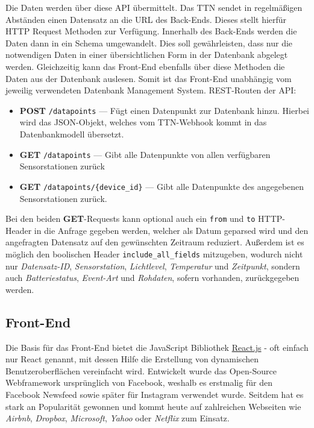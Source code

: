 \documentclass{article}
\begin{document}
Die Daten werden über diese API übermittelt. Das TTN sendet in regelmäßigen Abständen einen Datensatz an die URL des Back-Ends. 
Dieses stellt hierfür HTTP Request Methoden zur Verfügung. Innerhalb des Back-Ends werden die Daten dann in ein Schema umgewandelt.
Dies soll gewährleisten, dass nur die notwendigen Daten in einer übersichtlichen Form in der Datenbank abgelegt werden.
Gleichzeitig kann das Front-End ebenfalls über diese Methoden die Daten aus der Datenbank auslesen. Somit ist das Front-End unabhängig vom jeweilig verwendeten Datenbank Management System.
REST-Routen der API:
\begin{itemize}
    \item \textbf{POST} \texttt{/datapoints} --- Fügt einen Datenpunkt zur Datenbank hinzu. Hierbei wird das JSON-Objekt, welches vom TTN-Webhook kommt in das Datenbankmodell übersetzt.
    \item \textbf{GET} \texttt{/datapoints} --- Gibt alle Datenpunkte von allen verfügbaren Sensorstationen zurück
    \item \textbf{GET} \texttt{/datapoints/\{device\_id\}}  --- Gibt alle Datenpunkte des angegebenen Sensorstationen zurück.
\end{itemize}
Bei den beiden \textbf{GET}-Requests kann optional auch ein \texttt{from} und \texttt{to} HTTP-Header in die Anfrage gegeben werden, welcher als Datum geparsed wird und den angefragten Datensatz auf den gewünschten Zeitraum reduziert.
Außerdem ist es möglich den boolischen Header \texttt{include\_all\_fields} mitzugeben, wodurch nicht nur \textit{Datensatz-ID}, \textit{Sensorstation}, \textit{Lichtlevel}, \textit{Temperatur} und \textit{Zeitpunkt}, sondern auch \textit{Batteriestatus}, \textit{Event-Art} und \textit{Rohdaten}, sofern vorhanden, zurückgegeben werden.

\subsection{Front-End}
Die Basis für das Front-End bietet die JavaScript Bibliothek \href{https://reactjs.org}{React.js} - oft einfach nur React genannt, mit dessen Hilfe die Erstellung von dynamischen Benutzeroberflächen vereinfacht wird.
Entwickelt wurde das Open-Source Webframework ursprünglich von Facebook, weshalb es erstmalig für den Facebook Newsfeed sowie später für Instagram verwendet wurde.
Seitdem hat es stark an Popularität gewonnen und kommt heute auf zahlreichen Webseiten wie \textit{Airbnb}, \textit{Dropbox}, \textit{Microsoft}, \textit{Yahoo} oder \textit{Netflix} zum Einsatz.\\
\end{document}
